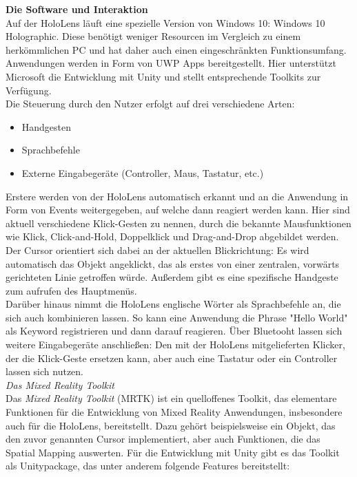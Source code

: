 \textbf{Die Software und Interaktion}\\
Auf der HoloLens läuft eine spezielle Version von Windows 10: Windows 10 Holographic. Diese benötigt weniger Resourcen im Vergleich zu einem herkömmlichen PC und hat daher auch einen eingeschränkten Funktionsumfang. Anwendungen werden in Form von UWP Apps bereitgestellt. Hier unterstützt Microsoft die Entwicklung mit Unity und stellt entsprechende Toolkits zur Verfügung.\\

Die Steuerung durch den Nutzer erfolgt auf drei verschiedene Arten:
\begin{itemize}
	\item Handgesten
	\item Sprachbefehle
	\item Externe Eingabegeräte (Controller, Maus, Tastatur, etc.)
\end{itemize}

Erstere werden von der HoloLens automatisch erkannt und an die Anwendung in Form von Events weitergegeben, auf welche dann reagiert werden kann. Hier sind aktuell verschiedene Klick-Gesten zu nennen, durch die bekannte Mausfunktionen wie Klick, Click-and-Hold, Doppelklick und Drag-and-Drop abgebildet werden. Der Cursor orientiert sich dabei an der aktuellen Blickrichtung: Es wird automatisch das Objekt angeklickt, das als erstes von einer zentralen, vorwärts gerichteten Linie getroffen würde. Außerdem gibt es eine spezifische Handgeste zum aufrufen des Hauptmenüs.\\

Darüber hinaus nimmt die HoloLens englische Wörter als Sprachbefehle an, die sich auch kombinieren lassen. So kann eine Anwendung die Phrase "Hello World" als Keyword registrieren und dann darauf reagieren. Über Bluetooht lassen sich weitere Eingabegeräte anschließen: Den mit der HoloLens mitgelieferten Klicker, der die Klick-Geste ersetzen kann, aber auch eine Tastatur oder ein Controller lassen sich nutzen.\\

\textit{Das Mixed Reality Toolkit}\\
Das \textit{Mixed Reality Toolkit} (MRTK) ist ein quelloffenes Toolkit, das elementare Funktionen für die Entwicklung von Mixed Reality Anwendungen, insbesondere auch für die HoloLens, bereitstellt. Dazu gehört beispielsweise ein Objekt, das den zuvor genannten Cursor implementiert, aber auch Funktionen, die das Spatial Mapping auswerten. Für die Entwicklung mit Unity gibt es das Toolkit als Unitypackage, das unter anderem folgende Features bereitstellt:

